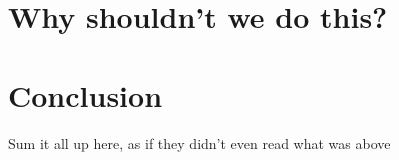 \documentclass[12pt]{amsart}
\begin{document}
    \section{Why shouldn't we do this?}\label{sec:why-shouldn't-we-do-this?}
    

    \section{Conclusion}\label{sec:conclusion}  %

    Sum it all up here, as if they didn't even read what was above ~\cite{mr-book}

    {}
    
\end{document}
